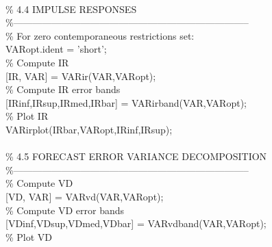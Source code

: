 \hspace{1mm} \\ 
\hspace{1mm}\textcolor{matlabgreen}{\% 4.4 IMPULSE RESPONSES }\\ 
\hspace{1mm}\textcolor{matlabgreen}{\%--------------------------------------------------------------------------  }\\ 
\hspace{1mm}\textcolor{matlabgreen}{\% For zero contemporaneous restrictions set: }\\ 
\hspace{1mm}VARopt.ident = \textcolor{matlabpurple}{'short'}; \\ 
\hspace{1mm}\textcolor{matlabgreen}{\% Compute IR }\\ 
\hspace{1mm}[IR, VAR] = VARir(VAR,VARopt); \\ 
\hspace{1mm}\textcolor{matlabgreen}{\% Compute IR error bands }\\ 
\hspace{1mm}[IRinf,IRsup,IRmed,IRbar] = VARirband(VAR,VARopt); \\ 
\hspace{1mm}\textcolor{matlabgreen}{\% Plot IR }\\ 
\hspace{1mm}VARirplot(IRbar,VARopt,IRinf,IRsup); \\ 
\hspace{1mm} \\ 
\hspace{1mm}\textcolor{matlabgreen}{\% 4.5 FORECAST ERROR VARIANCE DECOMPOSITION }\\ 
\hspace{1mm}\textcolor{matlabgreen}{\%--------------------------------------------------------------------------  }\\ 
\hspace{1mm}\textcolor{matlabgreen}{\% Compute VD }\\ 
\hspace{1mm}[VD, VAR] = VARvd(VAR,VARopt); \\ 
\hspace{1mm}\textcolor{matlabgreen}{\% Compute VD error bands }\\ 
\hspace{1mm}[VDinf,VDsup,VDmed,VDbar] = VARvdband(VAR,VARopt); \\ 
\hspace{1mm}\textcolor{matlabgreen}{\% Plot VD }\\ 
